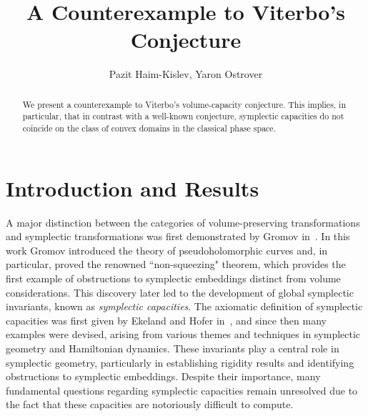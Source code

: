 \documentclass[10pt,a4paper]{article}
\theoremstyle{definition}
\begin{document}
\title{A Counterexample to Viterbo's Conjecture}
\author{Pazit Haim-Kislev, Yaron Ostrover}
\maketitle

\begin{abstract}
We present a counterexample to Viterbo's volume-capacity conjecture.    
This implies, in particular, that in contrast with a well-known conjecture, symplectic capacities do not coincide on the class of convex domains in the classical phase space.
\end{abstract}


\section{Introduction and Results}

A major distinction between the categories of volume-preserving transformations and symplectic transformations was first demonstrated by Gromov in~\cite{gromov}. In this work Gromov introduced the  theory of pseudoholomorphic curves and, in particular, proved the renowned ``non-squeezing" theorem, which provides the first example of obstructions to symplectic embeddings distinct from volume considerations. This discovery later led to the development of global symplectic invariants, known  as {\it symplectic capacities}. 
The axiomatic definition of symplectic capacities 
was first given by Ekeland and Hofer in~\cite{hofer-ekeland}, and since then many examples were devised, arising
 from various themes and techniques in symplectic geometry and Hamiltonian dynamics. These invariants play a central role in symplectic geometry, particularly in establishing rigidity results and identifying obstructions to symplectic embeddings.
Despite their 
importance, many fundamental questions regarding symplectic capacities remain unresolved due to the fact that these capacities are notoriously  difficult to compute.  


\medskip 
\end{document}
